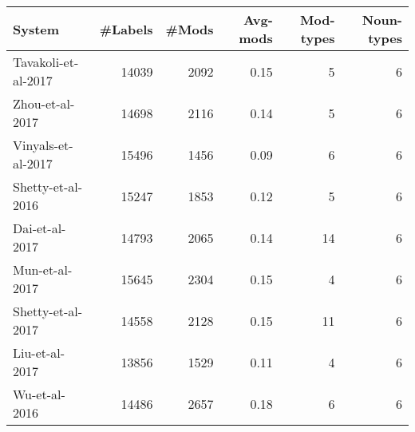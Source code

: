 \begin{tabular}{lrrrrr}
\toprule
 System              &   \#Labels &   \#Mods &   Avg-mods &   Mod-types &   Noun-types \\
\midrule
 Tavakoli-et-al-2017 &     14039 &    2092 &       0.15 &           5 &            6 \\
 Zhou-et-al-2017     &     14698 &    2116 &       0.14 &           5 &            6 \\
 Vinyals-et-al-2017  &     15496 &    1456 &       0.09 &           6 &            6 \\
 Shetty-et-al-2016   &     15247 &    1853 &       0.12 &           5 &            6 \\
 Dai-et-al-2017      &     14793 &    2065 &       0.14 &          14 &            6 \\
 Mun-et-al-2017      &     15645 &    2304 &       0.15 &           4 &            6 \\
 Shetty-et-al-2017   &     14558 &    2128 &       0.15 &          11 &            6 \\
 Liu-et-al-2017      &     13856 &    1529 &       0.11 &           4 &            6 \\
 Wu-et-al-2016       &     14486 &    2657 &       0.18 &           6 &            6 \\
\bottomrule
\end{tabular}